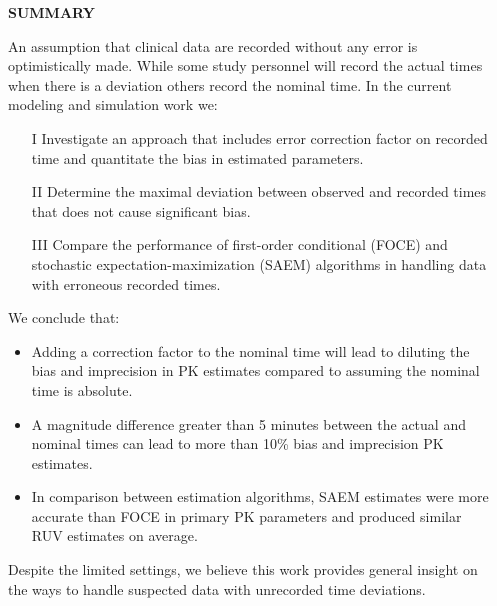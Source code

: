 \documentclass[final]{beamer}
\newlength{\sepwidth}
\newlength{\colwidth}
\newcommand{\separatorcolumn}{\begin{column}{\sepwidth}\end{column}}
\begin{document}
\begin{frame}[t]
\begin{columns}[t]
\separatorcolumn

\begin{column}{\colwidth}

  \begin{alertblock}{\textbf{SUMMARY}}

An assumption that clinical data are recorded without any error is optimistically made. While some study personnel will record the actual times when there is a deviation others record the nominal time. In the current modeling and simulation work we:
\begin{itemize}
\item[I] Investigate an approach that includes error correction factor on recorded time and quantitate the bias in estimated parameters.
\item[II] Determine the maximal deviation between observed and recorded times that does not cause significant bias. 
\item[III] Compare the performance of first-order conditional (FOCE) and stochastic expectation-maximization (SAEM) algorithms in handling data with erroneous recorded times. 
\end{itemize} 
We conclude that:
\begin{itemize}
    \item Adding a correction factor to the nominal time will lead to diluting the bias and imprecision in PK estimates compared to assuming the nominal time is absolute.
    \item A magnitude difference greater than 5 minutes between the actual and nominal times can lead to more than 10\% bias and imprecision PK estimates.
    \item In comparison between estimation algorithms, SAEM estimates were more accurate than FOCE in primary PK parameters and produced similar RUV estimates on average. 
\end{itemize}

Despite the limited settings, we believe this work provides general insight on the ways to handle suspected data with unrecorded time deviations.


\end{alertblock}
\end{column}
\end{columns}
\end{frame}
\end{document}
